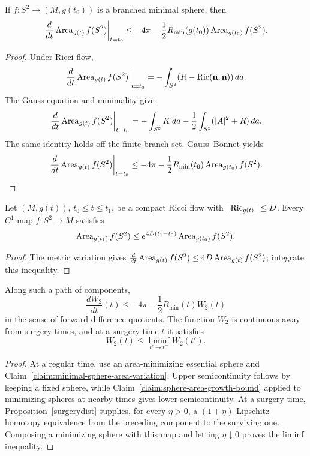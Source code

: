 \begin{claim}
\label{claim:minimal-sphere-area-variation}
\label{varareaform}
If $f\colon S^2\to(M,g(t_0))$ is a branched minimal sphere, then
\[
\left.\frac d{dt}\operatorname{Area}_{g(t)}f(S^2)\right|_{t=t_0}
\le -4\pi-\frac12R_{\min}(g(t_0))\operatorname{Area}_{g(t_0)}f(S^2).
\]
\end{claim}
\begin{proof}
\sketch Under Ricci flow,
\begin{equation}\label{ha1}
\left.\frac d{dt}\operatorname{Area}_{g(t)}f(S^2)\right|_{t=t_0}
=-\int_{S^2}(R-\operatorname{Ric}({\bf n},{\bf n}))\,da.
\end{equation}
The Gauss equation and minimality give
\begin{equation}\label{ha2}
\left.\frac d{dt}\operatorname{Area}_{g(t)}f(S^2)\right|_{t=t_0}
=-\int_{S^2}K\,da-\frac12\int_{S^2}(|A|^2+R)\,da.
\end{equation}
The same identity holds off the finite branch set. Gauss--Bonnet yields
\begin{equation}\label{ha3}
\left.\frac d{dt}\operatorname{Area}_{g(t)}f(S^2)\right|_{t=t_0}
\le-4\pi-\frac12R_{\min}(t_0)\operatorname{Area}_{g(t_0)}f(S^2).
\end{equation}
\end{proof}

\begin{claim}
\label{claim:sphere-area-growth-bound}
Let $(M,g(t))$, $t_0\le t\le t_1$, be a compact Ricci flow with
$|\operatorname{Ric}_{g(t)}|\le D$. Every $C^1$ map $f\colon S^2\to M$ satisfies
\[
\operatorname{Area}_{g(t_1)}f(S^2)\le e^{4D(t_1-t_0)}\operatorname{Area}_{g(t_0)}f(S^2).
\]
\end{claim}
\begin{proof}
\sketch The metric variation gives
$\frac d{dt}\operatorname{Area}_{g(t)}f(S^2)\le4D\operatorname{Area}_{g(t)}f(S^2)$; integrate this
inequality.
\end{proof}

\begin{lemma}
\label{lem:w2-forward-difference-quotient}
\label{W_2}

Along such a path of components,
\[
\frac{dW_2}{dt}(t)\le-4\pi-\frac12R_{\min}(t)W_2(t)
\]
in the sense of forward difference quotients. The function $W_2$ is continuous
away from surgery times, and at a surgery time $t$ it satisfies
\[
W_2(t)\le\liminf_{t'\to t^-}W_2(t').
\]
\end{lemma}
\begin{proof}
\sketch At a regular time, use an area-minimizing essential sphere and
Claim~\ref{claim:minimal-sphere-area-variation}. Upper semicontinuity follows
by keeping a fixed sphere, while Claim~\ref{claim:sphere-area-growth-bound}
applied to minimizing spheres at nearby times gives lower semicontinuity. At a
surgery time, Proposition~\ref{surgerydist} supplies, for every $\eta>0$, a
$(1+\eta)$-Lipschitz homotopy equivalence from the preceding component to the
surviving one. Composing a minimizing sphere with this map and letting
$\eta\downarrow0$ proves the liminf inequality.
\end{proof}

